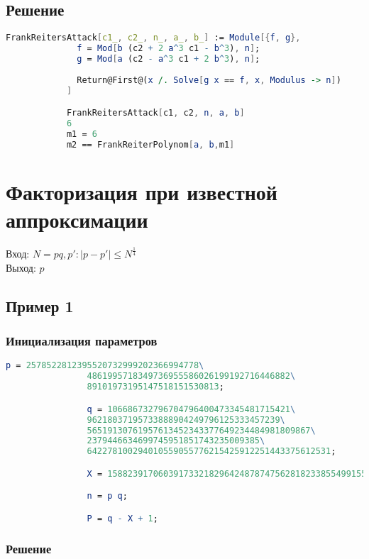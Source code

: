     	\subsection{Решение}

    		\begin{lstlisting}[language=Mathematica,caption={
	      		Решение
	    	}]
			FrankReitersAttack[c1_, c2_, n_, a_, b_] := Module[{f, g},
			  f = Mod[b (c2 + 2 a^3 c1 - b^3), n];
			  g = Mod[a (c2 - a^3 c1 + 2 b^3), n];
			  
			  Return@First@(x /. Solve[g x == f, x, Modulus -> n])
			]

			FrankReitersAttack[c1, c2, n, a, b]
			6
			m1 = 6
			m2 == FrankReiterPolynom[a, b,m1]
	    	\end{lstlisting}

	\section{Факторизация при известной аппроксимации}
		Вход: {$ N = p q, p': |p-p'| \le N^\frac{1}{4} $} \\   
  		Выход: {$p$}  

  		\subsection{Пример 1}

	  		\subsubsection{Инициализация параметров}

	  			\begin{lstlisting}[language=Mathematica,caption={
		      		Инициализация параметров
		    	}]
				p = 2578522812395520732999202366994778\
				4861995718349736955586026199192716446882\
				89101973195147518151530813;

				q = 106686732796704796400473345481715421\
				96218037195733888904249796125333457239\
				56519130761957613452343377649234484981809867\
				2379446634699745951851743235009385\
				642278100294010559055776215425912251443375612531;

				X = 158823917060391733218296424878747562818233855499155999;

				n = p q;

				P = q - X + 1;
		    	\end{lstlisting}

	    	\subsubsection{Решение}

